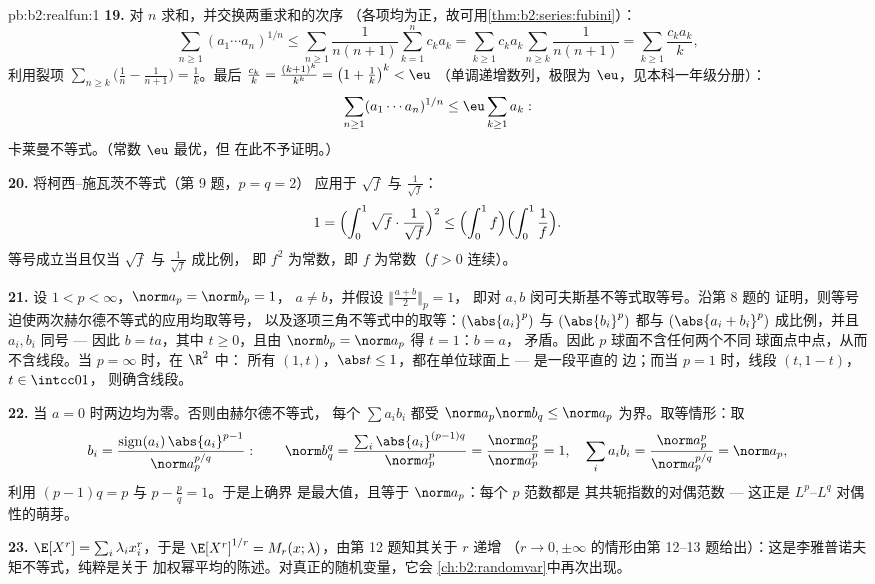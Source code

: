 \begin{solution}{pb:b2:realfun:1}
\textbf{19.} 对 $n$ 求和，并交换两重求和的次序
（各项均为正，故可用\cref{thm:b2:series:fubini}）：
\[
\sum_{n\geq1}(a_1\cdots a_n)^{1/n}
\leq \sum_{n\geq1}\frac{1}{n(n+1)}\sum_{k=1}^{n}c_ka_k
= \sum_{k\geq1}c_ka_k\sum_{n\geq k}\frac1{n(n+1)}
= \sum_{k\geq1}\frac{c_ka_k}{k},
\]
利用裂项 $\sum_{n\geq k}\bigl(\frac1n -
\frac1{n+1}\bigr) = \frac1k$。最后 $\frac{c_k}k =
\frac{(k+1)^k}{k^k} = \bigl(1 + \frac1k\bigr)^k < \eu$
（单调递增数列，极限为 $\eu$，见本科一年级分册）：
\[
\sum_{n\geq1}(a_1\cdots a_n)^{1/n} \leq
\eu\sum_{k\geq1}a_k :
\]
卡莱曼不等式。（常数 $\eu$ 最优，但
在此不予证明。）

\textbf{20.} 将柯西--施瓦茨不等式（第 9 题，$p = q = 2$）
应用于 $\sqrt f$ 与 $\frac1{\sqrt f}$：
\[
1 = \Bigl(\int_0^1\sqrt f\cdot\frac{1}{\sqrt f}\Bigr)^{2}
\leq \Bigl(\int_0^1 f\Bigr)\Bigl(\int_0^1\frac1f\Bigr).
\]
等号成立当且仅当 $\sqrt f$ 与 $\frac1{\sqrt f}$ 成比例，
即 $f^2$ 为常数，即 $f$ 为常数（$f > 0$ 连续）。

\textbf{21.} 设 $1 < p < \infty$，$\norm a_p = \norm b_p = 1$，
$a \neq b$，并假设 $\bigl\Vert\frac{a+b}2\bigr\Vert_p = 1$，
即对 $a, b$ 闵可夫斯基不等式取等号。沿第 8 题的
证明，则等号迫使两次赫尔德不等式的应用均取等号，
以及逐项三角不等式中的取等：$(\abs{a_i}^p)$ 与
$(\abs{b_i}^p)$ 都与 $(\abs{a_i + b_i}^p)$ 成比例，并且
$a_i, b_i$ 同号 --- 因此 $b = ta$，其中 $t \geq
0$，且由 $\norm b_p = \norm a_p$ 得 $t = 1$：$b = a$，
矛盾。因此 $p$ 球面不含任何两个不同
球面点中点，从而不含线段。当 $p = \infty$ 时，在 $\R^2$ 中：
所有 $(1, t)$，$\abs t \leq 1$，都在单位球面上 --- 是一段平直的
边；而当 $p = 1$ 时，线段 $(t, 1 - t)$，$t \in \intcc01$，
则确含线段。

\textbf{22.} 当 $a = 0$ 时两边均为零。否则由赫尔德不等式，
每个 $\sum a_ib_i$ 都受 $\norm a_p\norm b_q \leq \norm
a_p$ 为界。取等情形：取
\[
b_i = \frac{\operatorname{sign}(a_i)\,\abs{a_i}^{p-1}}
{\norm a_p^{p/q}} :
\qquad
\norm b_q^q = \frac{\sum_i\abs{a_i}^{(p-1)q}}{\norm a_p^{p}}
= \frac{\norm a_p^p}{\norm a_p^p} = 1,
\quad
\sum_ia_ib_i = \frac{\norm a_p^p}{\norm a_p^{p/q}} =
\norm a_p ,
\]
利用 $(p-1)q = p$ 与 $p - \frac pq = 1$。于是上确界
是最大值，且等于 $\norm a_p$：每个 $p$ 范数都是
其共轭指数的对偶范数 --- 这正是 $L^p$--$L^q$ 对偶性的萌芽。

\textbf{23.} $\E[X^r] = \sum_i\lambda_ix_i^r$，于是
$\E[X^r]^{1/r} = M_r(x; \lambda)$，由第 12 题知其关于 $r$ 递增
（$r \to 0, \pm\infty$ 的情形由第
12--13 题给出）：这是李雅普诺夫矩不等式，纯粹是关于
加权幂平均的陈述。对真正的随机变量，它会
\cref{ch:b2:randomvar}中再次出现。


\end{solution}
